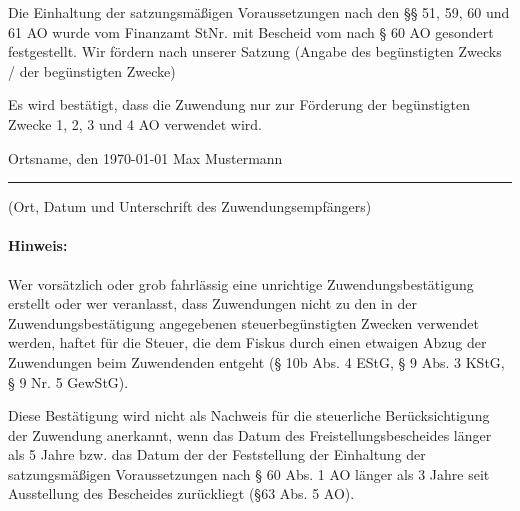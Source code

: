 \documentclass[12pt,ngerman]{scrartcl}
\newcommand{\notmarked}{\scalebox{1.5}{\Square}}
\begin{document}
\begin{Form}
\notmarked Die Einhaltung der satzungsmäßigen Voraussetzungen nach den §§ 51, 59, 60 und 61 AO wurde vom Finanzamt \hdashrule{2cm}{1pt}{1pt} StNr. \hdashrule{2cm}{1pt}{1pt} mit Bescheid vom\hdashrule{2cm}{1pt}{1pt} nach § 60 AO gesondert festgestellt. Wir fördern nach unserer Satzung (Angabe des begünstigten Zwecks / der begünstigten Zwecke) \hdashrule{2cm}{1pt}{1pt}
 
\begin{mdframed}[style=MyFormStyle]%
Es wird bestätigt, dass die Zuwendung nur zur Förderung der begünstigten Zwecke 1, 2, 3 und 4 AO verwendet wird. 
\end{mdframed} 


\vspace*{2.5em} 

Ortsname, den \today \hspace*{20em} Max Mustermann

\hrule

\vspace*{0.5em} (Ort, Datum und Unterschrift des Zuwendungsempfängers) 

\paragraph{Hinweis:} Wer vorsätzlich oder grob fahrlässig eine unrichtige Zuwendungsbestätigung erstellt oder wer veranlasst, dass 
Zuwendungen nicht zu den in der Zuwendungsbestätigung angegebenen steuerbegünstigten Zwecken verwendet 
werden, haftet für die Steuer, die dem Fiskus durch einen etwaigen Abzug der Zuwendungen beim Zuwendenden entgeht (§ 10b Abs. 4 EStG, § 9 Abs. 3 KStG, § 9 Nr. 5 GewStG). 

Diese Bestätigung wird nicht als Nachweis für die steuerliche Berücksichtigung der Zuwendung anerkannt, wenn das Datum des Freistellungsbescheides länger als 5 Jahre bzw. das Datum der der Feststellung der Einhaltung der satzungsmäßigen Voraussetzungen nach § 60 Abs. 1 AO länger als 3 Jahre seit Ausstellung des Bescheides zurückliegt (§63 Abs. 5 AO). 


\end{Form}
\end{document}
